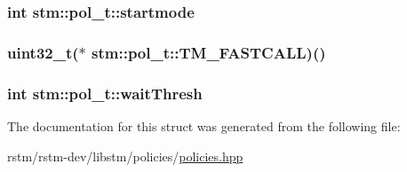 \hypertarget{structstm_1_1pol__t_a3e0bcae5db5a642fd1fd52e70b407912}{
\subsubsection[{startmode}]{\setlength{\rightskip}{0pt plus 5cm}int stm\-::pol\-\_\-t\-::startmode}}\label{structstm_1_1pol__t_a3e0bcae5db5a642fd1fd52e70b407912}
\hypertarget{structstm_1_1pol__t_aa39cd629fff95a9112ab8b0fb3fc4937}{
\subsubsection[{T\-M\-\_\-\-F\-A\-S\-T\-C\-A\-L\-L}]{\setlength{\rightskip}{0pt plus 5cm}uint32\-\_\-t($\ast$ stm\-::pol\-\_\-t\-::\-T\-M\-\_\-\-F\-A\-S\-T\-C\-A\-L\-L)()}}\label{structstm_1_1pol__t_aa39cd629fff95a9112ab8b0fb3fc4937}
\hypertarget{structstm_1_1pol__t_ab2fcda8fb37a957d85680298c74534e2}{
\subsubsection[{wait\-Thresh}]{\setlength{\rightskip}{0pt plus 5cm}int stm\-::pol\-\_\-t\-::wait\-Thresh}}\label{structstm_1_1pol__t_ab2fcda8fb37a957d85680298c74534e2}


The documentation for this struct was generated from the following file\-:\begin{DoxyCompactItemize}
\item 
rstm/rstm-\/dev/libstm/policies/\hyperlink{policies_8hpp}{policies.\-hpp}\end{DoxyCompactItemize}

